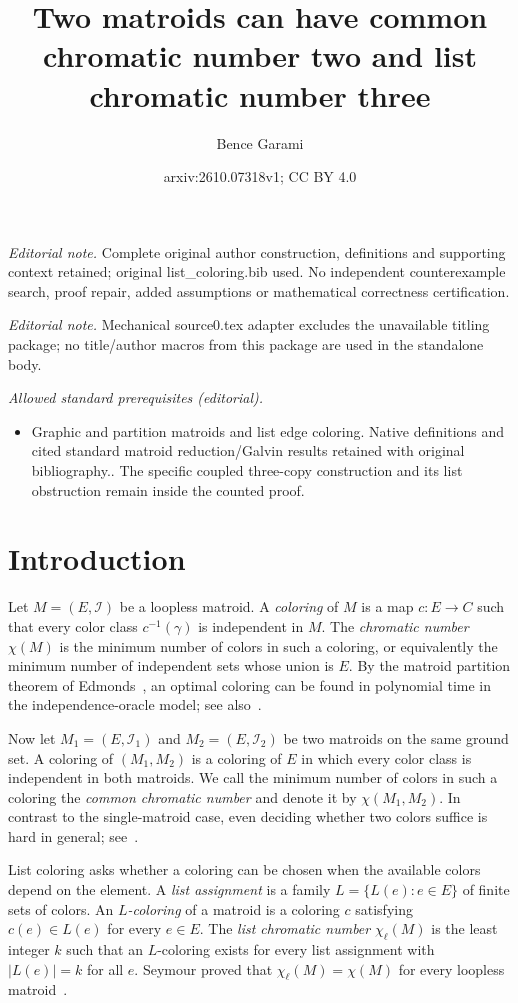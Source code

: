 \documentclass[10pt,a4paper]{article}
\title{Two matroids can have common chromatic number two and list chromatic number three}
\author{Bence Garami}
\date{arxiv:2610.07318v1; CC BY 4.0}
\theoremstyle{plain}
\theoremstyle{definition}
\newcommand{\cI}{\mathcal{I}}
\begin{document}
\maketitle
\noindent\textit{Editorial note.} Complete original author construction, definitions and supporting context retained; original list\_coloring.bib used. No independent counterexample search, proof repair, added assumptions or mathematical correctness certification.\par\medskip
\noindent\textit{Editorial note.} Mechanical source0.tex adapter excludes the unavailable titling package; no title/author macros from this package are used in the standalone body.\par\medskip
\noindent\textit{Allowed standard prerequisites (editorial).}\begin{itemize}
\item Graphic and partition matroids and list edge coloring. Native definitions and cited standard matroid reduction/Galvin results retained with original bibliography.. The specific coupled three-copy construction and its list obstruction remain inside the counted proof.
\end{itemize}\medskip
\section{Introduction}
\label{sec:intro}

Let $M=(E,\cI)$ be a loopless matroid. A \textit{coloring} of $M$ is a map $c\colon E\to C$ such that every color class $c^{-1}(\gamma)$ is independent in $M$. The \textit{chromatic number} $\chi(M)$ is the minimum number of colors in such a coloring, or equivalently the minimum number of independent sets whose union is $E$. By the matroid partition theorem of Edmonds~\cite{edmonds1965minimum}, an optimal coloring can be found in polynomial time in the independence-oracle model; see also~\cite[Chapter~42]{schrijver2003combinatorial}.

Now let $M_1=(E,\cI_1)$ and $M_2=(E,\cI_2)$ be two matroids on the same ground set. A coloring of $(M_1,M_2)$ is a coloring of $E$ in which every color class is independent in both matroids. We call the minimum number of colors in such a coloring the \textit{common chromatic number} and denote it by $\chi(M_1,M_2)$. In contrast to the single-matroid case, even deciding whether two colors suffice is hard in general; see~\cite{berczi2021complexity}.

List coloring asks whether a coloring can be chosen when the available colors depend on the element. A \textit{list assignment} is a family $L=\{L(e)\colon e\in E\}$ of finite sets of colors. An \textit{$L$-coloring} of a matroid is a coloring $c$ satisfying $c(e)\in L(e)$ for every $e\in E$. The \textit{list chromatic number} $\chi_\ell(M)$ is the least integer $k$ such that an $L$-coloring exists for every list assignment with $|L(e)|=k$ for all $e$. Seymour proved that $\chi_\ell(M)=\chi(M)$ for every loopless matroid~\cite{seymour1998note}.
\end{document}
